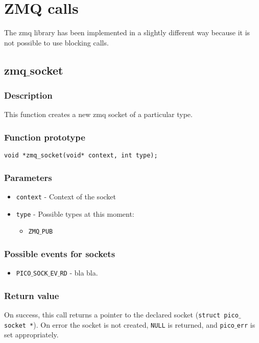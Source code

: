 \section{ZMQ calls} 
The zmq library has been implemented in a slightly different way because it is not
possible to use blocking calls.

\subsection{zmq$\_$socket}

\subsubsection*{Description}
This function creates a new zmq socket of a particular type.

\subsubsection*{Function prototype}
\begin{verbatim}
void *zmq_socket(void* context, int type);
\end{verbatim}

\subsubsection*{Parameters}
\begin{itemize}[noitemsep]
\item \texttt{context} - Context of the socket
\item \texttt{type} - Possible types at this moment:
\begin{itemize}[noitemsep]
\item \texttt{ZMQ$\_$PUB}
\end{itemize}
\end{itemize}

\subsubsection*{Possible events for sockets}
\begin{itemize}[noitemsep]
\item \texttt{PICO$\_$SOCK$\_$EV$\_$RD} - bla bla.
\end{itemize}

\subsubsection*{Return value}
On success, this call returns a pointer to the declared socket (\texttt{struct pico$\_$socket *}).
On error the socket is not created, \texttt{NULL} is returned, and \texttt{pico$\_$err} is set appropriately.

